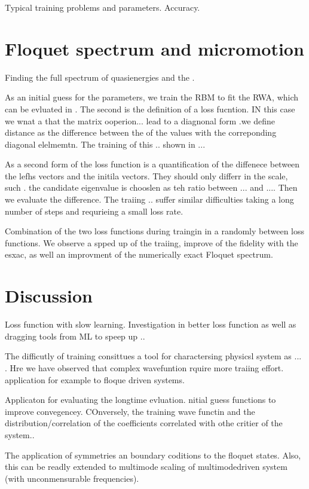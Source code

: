 \documentclass[pra,twocolumn,showkeys,preprintnumbers, amsmath,amssymb, aps,A4paper]{revtex4-1}
\begin{document}
Typical training problems and parameters. Accuracy. 




\section{\label{sec:RBMFloquetSpectrum} Floquet spectrum and micromotion}

Finding the full spectrum of quasienergies and the .

As an initial guess for the parameters, we train the RBM to fit the RWA, which can be evluated in . The second is the definition of a loss fucntion. IN this case we wnat a that the matrix ooperion... lead to a diagnonal form .we define distance as the difference between the of the values with the correponding diagonal elelmemtn. The training of this ..  shown in ...

As a second form of the loss function is a quantification of the diffenece between the lefhs vectors and the initila vectors. They should only differr in the scale, such . the candidate eigenvalue is chooslen as teh ratio between ... and .... Then we evaluate the difference.  The traiing .. suffer similar difficulties taking a long number of steps and requrieing a small loss rate. 


Combination of the two loss functions during traingin in a randomly between loss functions. We observe a spped up of the traiing, improve of the fidelity with the esxac, as well an improvment of the numerically exact Floquet spectrum.




\section{\label{sec:discussion} Discussion}

Loss function with slow learning. Investigation in better loss function as well as dragging tools from ML to speep up .. 

The difficutly of training consittues a tool for charactersing physicsl system as ... . Hre we have observed that complex wavefuntion rquire more traiing effort. application for example to floque driven systems.

Applicaton for evaluating the longtime evluation. nitial guess functions to improve convegencey. COnversely, the training wave functin and the distribution/correlation of the coefficients correlated with othe critier of the system..

The application of symmetries an boundary coditions to the floquet states. Also, this can be readly extended to multimode scaling of multimodedriven system (with unconmensurable frequencies).
 
\end{document}

